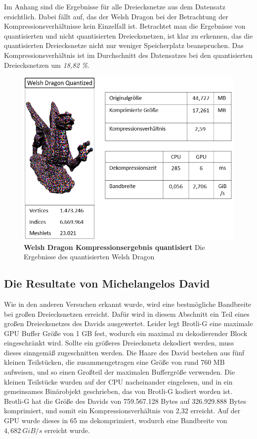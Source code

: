 Im Anhang sind die Ergebnisse für alle Dreiecksnetze aus dem Datensatz ersichtlich.
Dabei fällt auf, das der Welsh Dragon bei der Betrachtung der Kompressionsverhältnisse kein Einzelfall ist.
Betrachtet man die Ergebnisse von quantisierten und nicht quantisierten Dreiecksnetzen, ist klar zu erkennen, das die quantisierten Dreiecksnetze nicht nur weniger Speicherplatz beanspruchen.
Das Kompressionsverhältnis ist im Durchschnitt des Datensatzes bei den quantisierten Dreiecksnetzen um \textit{18,82 \%}.

\begin{figure}[htb]
  \centering  
  \includegraphics[scale=0.75]{Bilder/ergebnisse/welshdragon_q.png}
  \caption[Welsh Dragon Kompressionsergebnis quantisiert]{\textbf{Welsh Dragon Kompressionsergebnis quantisiert} Die Ergebnisse des quantisierten Welsh Dragon }
  \label{fig:quantized_welsh_dragon}
\end{figure}

\subsection{Die Resultate von Michelangelos David}
\label{subsec:auswertung3}
Wie in den anderen Versuchen erkannt wurde, wird eine bestmögliche Bandbreite bei großen Dreiecksnetzen erreicht.
Dafür wird in diesem Abschnitt ein Teil eines großen Dreiecksnetzes des Davids ausgewertet.
Leider legt Brotli-G eine maximale GPU Buffer Größe von 1 GB fest, wodurch ein maximal zu dekodierender Block eingeschränkt wird.
Sollte ein größeres Dreiecksnetz dekodiert werden, muss dieses sinngemäß zugeschnitten werden.
Die Haare des David bestehen aus fünf kleinen Teilstücken, die zusammengetragen eine Größe von rund 760 MB aufweisen, und so einen Großteil der maximalen Buffergröße verwenden.
Die kleinen Teilstücke wurden auf der CPU nacheinander eingelesen, und in ein gemeinsames Binärobjekt geschrieben, das von Brotli-G kodiert worden ist. \newline
Brotli-G hat die Größe des Davids von 759.567.128 Bytes auf 326.929.888 Bytes komprimiert, und somit ein Kompressionsverhältnis von 2,32 erreicht.
Auf der GPU wurde dieses in 65 ms dekomprimiert, wodurch eine Bandbreite von $\mathit{4,682 \ GiB/s}$ erreicht wurde.

